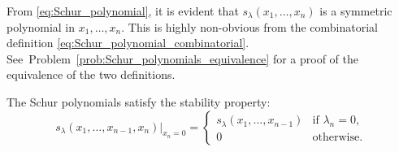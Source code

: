 \documentclass[letterpaper,11pt,oneside,reqno]{article}
\numberwithin{equation}{section}
\theoremstyle{definition}
\begin{document}
From \eqref{eq:Schur_polynomial}, it is evident that $s_\lambda(x_1,\ldots,x_n )$ is a
symmetric polynomial in $x_1,\ldots,x_n$.
This is highly non-obvious from the combinatorial definition \eqref{eq:Schur_polynomial_combinatorial}.
See~Problem~\ref{prob:Schur_polynomials_equivalence} for a proof of the equivalence of the two definitions.

The Schur polynomials satisfy the stability property:
\begin{equation}
	\label{eq:stability_property_Schur}
	s_\lambda(x_1,\ldots,x_{n-1},x_n)\big\vert_{x_n=0} =
	\begin{cases}
		s_\lambda(x_1,\ldots,x_{n-1}) & \text{if } \lambda_n=0,\\
		0 & \text{otherwise.}
	\end{cases}
\end{equation}
\end{document}
